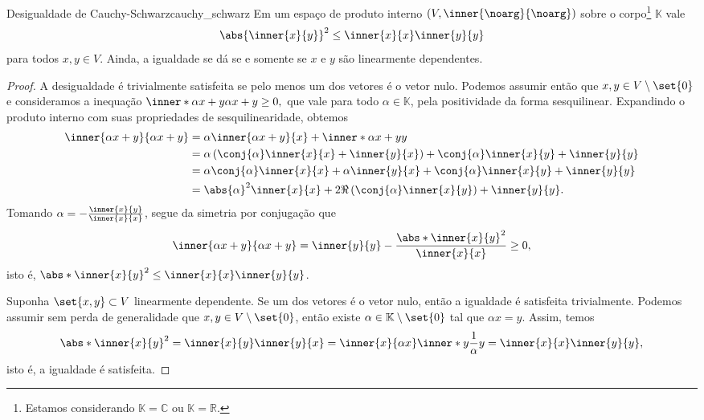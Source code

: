 \begin{lemma}{Desigualdade de Cauchy-Schwarz}{cauchy_schwarz}
    Em um espaço de produto interno \((V, \inner{\noarg}{\noarg})\) sobre o corpo\footnote{Estamos considerando \(\mathbb{K} = \mathbb{C}\) ou \(\mathbb{K} = \mathbb{R}.\)} \(\mathbb{K}\) vale
    \begin{equation*}
        \abs{\inner{x}{y}}^2 \leq \inner{x}{x} \inner{y}{y}
    \end{equation*}
    para todos \(x, y \in V.\) Ainda, a igualdade se dá se e somente se \(x\) e \(y\) são linearmente dependentes.
\end{lemma}
\begin{proof}
    A desigualdade é trivialmente satisfeita se pelo menos um dos vetores é o vetor nulo. Podemos assumir então que \(x, y \in V \setminus\set{0}\) e consideramos a inequação \(\inner*{\alpha x + y}{\alpha x + y} \geq 0,\) que vale para todo \(\alpha \in \mathbb{K}\), pela positividade da forma sesquilinear. Expandindo o produto interno com suas propriedades de sesquilinearidade, obtemos
    \begin{align*}
        \inner{\alpha x + y}{\alpha x + y} &= \alpha\inner{\alpha x + y}{x} + \inner*{\alpha x + y}{y}\\
                                           &= \alpha \left(\conj{\alpha} \inner{x}{x} + \inner{y}{x}\right) + \conj{\alpha}\inner{x}{y} + \inner{y}{y}\\
                                           &= \alpha\conj{\alpha}\inner{x}{x} + \alpha \inner{y}{x} + \conj{\alpha}\inner{x}{y} + \inner{y}{y}\\
                                           &= \abs{\alpha}^2 \inner{x}{x} + 2\Re\left(\conj{\alpha}\inner{x}{y}\right) + \inner{y}{y}.
    \end{align*}
    Tomando \(\alpha = - \frac{\inner{x}{y}}{\inner{x}{x}}\), segue da simetria por conjugação que
    \begin{equation*}
        \inner{\alpha x + y}{\alpha x + y} = \inner{y}{y} - \frac{\abs*{\inner{x}{y}}^2}{\inner{x}{x}} \geq 0,
    \end{equation*}
    isto é, \(\abs*{\inner{x}{y}}^2 \leq \inner{x}{x} \inner{y}{y}\).

    Suponha \(\set{x,y} \subset V\) linearmente dependente. Se um dos vetores é o vetor nulo, então a igualdade é satisfeita trivialmente. Podemos assumir sem perda de generalidade que \(x, y \in V\setminus\set{0}\), então existe \(\alpha \in \mathbb{K}\setminus\set{0}\) tal que \(\alpha x = y\). Assim, temos
    \begin{equation*}
        \abs*{\inner{x}{y}}^2 = \inner{x}{y}\inner{y}{x} = \inner{x}{\alpha x}\inner*{y}{\frac1\alpha y} = \inner{x}{x} \inner{y}{y},
    \end{equation*}
    isto é, a igualdade é satisfeita.


\end{proof}
